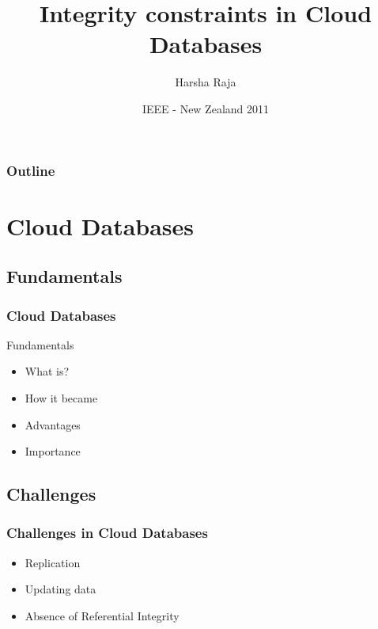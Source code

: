 \documentclass[mathserif,trans]{beamer}
\title{Integrity constraints in Cloud Databases}
\author[\insertframenumber/\inserttotalframenumber\hspace{7em} Harsha
Raja]{Harsha Raja}
\institute[Victoria University of Wellington]
{
Victoria University of Wellington\\
Wellington, New Zealand\\
}
\date[IEEE-NZ]{IEEE - New Zealand 2011}
\begin{document}
\begin{frame}
\titlepage
\end{frame}

\begin{frame}
\frametitle{Outline}
\tableofcontents[pausesections]
\end{frame}


\section{Cloud Databases}
	\subsection{Fundamentals}
	
	\begin{frame}
		\frametitle{Cloud Databases}
		
		\begin{block}{Fundamentals}
			\begin{itemize}
			  \item What is?
			  \item How it became
			  \item Advantages
			  \item Importance
			\end{itemize}
		\end{block}
		
	\end{frame}
	
	
	\subsection{Challenges}
	
	\begin{frame}
		\frametitle{Challenges in Cloud Databases}
		
		\begin{block}{}
			\begin{itemize}
			  \item Replication
			  \item Updating data
			  \item Absence of Referential Integrity
			\end{itemize}
		\end{block}
		
	\end{frame}
	
\end{document}
